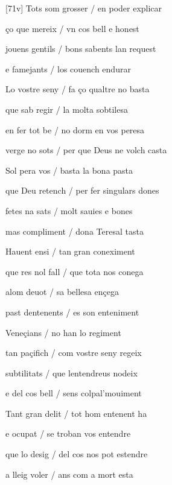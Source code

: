 \documentclass[12pt]{article}
\begin{document}
\begin{estrofa}

 [71v] Tots som grosser / en poder explicar

 \c{c}o que mereix / vn cos bell e honest

 jouens gentils / bons sabents lan request

 e famejants / los couench endurar

 Lo vostre seny / fa \c{c}o qualtre no basta

 que sab regir / la molta sobtilesa

 en fer tot be / no dorm en vos peresa

 verge no sots / per que Deus ne volch casta

\end{estrofa}



\begin{estrofa}

 Sol pera vos / basta la bona pasta

 que Deu retench / per fer singulars dones

 fetes na sats / molt sauies e bones

 mas compliment / dona Teresal tasta

 Hauent ensi / tan gran coneximent

 que res nol fall / que tota nos conega

 alom deuot / sa bellesa en\c{c}ega

 past dentenents / es son enteniment

\end{estrofa}



\begin{estrofa}

 Vene\c{c}ians / no han lo regiment

 tan pa\c{c}ifich / com vostre seny regeix

 subtilitats / que lentendreus nodeix

 e del cos bell / sens colpal'mouiment

 Tant gran delit / tot hom entenent ha

 e ocupat / se troban vos entendre

 que lo desig / del cos nos pot estendre

 a lleig voler / ans com a mort esta

\end{estrofa}
\end{document}
